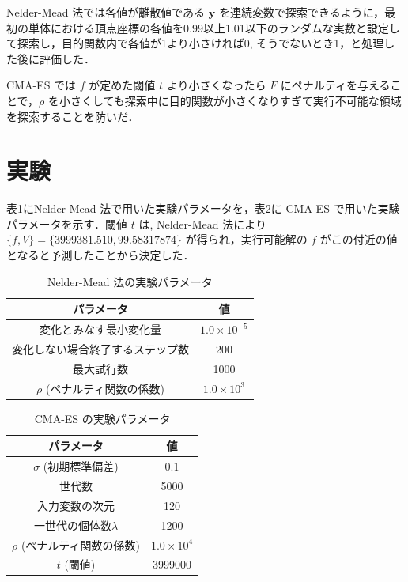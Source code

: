 \documentclass[twocolumn]{jarticle}
\begin{document}
Nelder-Mead 法では各値が離散値である $\bm{y}$ を連続変数で探索できるように，最初の単体における頂点座標の各値を0.99以上1.01以下のランダムな実数と設定して探索し，目的関数内で各値が1より小さければ0, そうでないとき1，と処理した後に評価した．

CMA-ES では $f$ が定めた閾値 $t$ より小さくなったら $F$ にペナルティを与えることで，$\rho$ を小さくしても探索中に目的関数が小さくなりすぎて実行不可能な領域を探索することを防いだ．

\section{実験}
表\ref{setting_nelder}にNelder-Mead 法で用いた実験パラメータを，表\ref{setting_cmaes}に CMA-ES で用いた実験パラメータを示す．閾値 $t$ は, Nelder-Mead 法により $\{f, V\}=\{3999381.510, 99.58317874\}$ が得られ，実行可能解の $f$ がこの付近の値となると予測したことから決定した．
\begin{table}[htbp]
    \begin{center}
        \caption{Nelder-Mead 法の実験パラメータ}
        \label{setting_nelder}
        \begin{tabular}{| c | c |} \hline
            パラメータ & 値 \\ \hline
            変化とみなす最小変化量 & $1.0\times10^{-5}$ \\
            変化しない場合終了するステップ数 & 200 \\
            最大試行数 & 1000 \\
            $\rho$ (ペナルティ関数の係数) & $1.0\times10^{3}$\\ \hline
        \end{tabular}
    \end{center}
\end{table}

\begin{table}[htbp]
    \begin{center}
        \caption{CMA-ES の実験パラメータ}
        \label{setting_cmaes}
        \begin{tabular}{| c | c |} 
            \hline
            パラメータ & 値 \\ 
            \hline
            $\sigma$ (初期標準偏差) &  0.1 \\
            世代数 & 5000 \\
            入力変数の次元 & 120 \\
            一世代の個体数$\lambda$ & 1200 \\
            $\rho$ (ペナルティ関数の係数) & $1.0\times10^{4}$\\
            $t$ (閾値) & 3999000 \\
            \hline
        \end{tabular}
    \end{center}
\end{table}
\end{document}
